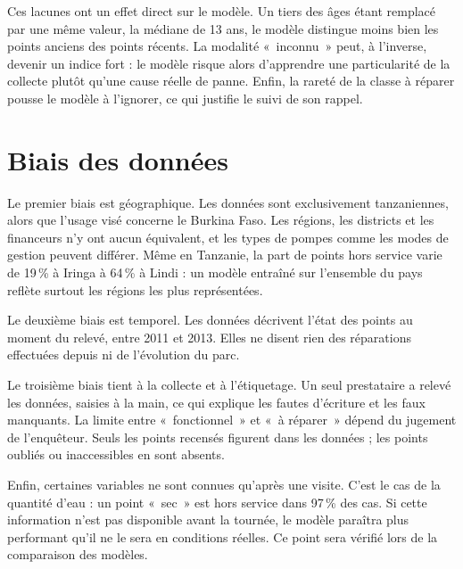 \documentclass[10pt,a4paper]{article}
\begin{document}
\smallskip
Ces lacunes ont un effet direct sur le modèle. Un tiers des âges étant remplacé par une même valeur, la médiane de 13 ans, le modèle distingue moins bien les points anciens des points récents. La modalité «~inconnu~» peut, à l'inverse, devenir un indice fort : le modèle risque alors d'apprendre une particularité de la collecte plutôt qu'une cause réelle de panne. Enfin, la rareté de la classe à réparer pousse le modèle à l'ignorer, ce qui justifie le suivi de son rappel.

\section{Biais des données}
Le premier biais est géographique. Les données sont exclusivement tanzaniennes, alors que l'usage visé concerne le Burkina Faso. Les régions, les districts et les financeurs n'y ont aucun équivalent, et les types de pompes comme les modes de gestion peuvent différer. Même en Tanzanie, la part de points hors service varie de 19\,\% à Iringa à 64\,\% à Lindi : un modèle entraîné sur l'ensemble du pays reflète surtout les régions les plus représentées.

Le deuxième biais est temporel. Les données décrivent l'état des points au moment du relevé, entre 2011 et 2013. Elles ne disent rien des réparations effectuées depuis ni de l'évolution du parc.

Le troisième biais tient à la collecte et à l'étiquetage. Un seul prestataire a relevé les données, saisies à la main, ce qui explique les fautes d'écriture et les faux manquants. La limite entre «~fonctionnel~» et «~à réparer~» dépend du jugement de l'enquêteur. Seuls les points recensés figurent dans les données ; les points oubliés ou inaccessibles en sont absents.

Enfin, certaines variables ne sont connues qu'après une visite. C'est le cas de la quantité d'eau : un point «~sec~» est hors service dans 97\,\% des cas. Si cette information n'est pas disponible avant la tournée, le modèle paraîtra plus performant qu'il ne le sera en conditions réelles. Ce point sera vérifié lors de la comparaison des modèles.
\end{document}
